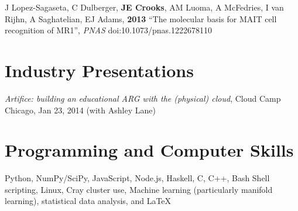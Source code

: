 \documentclass[margin,line]{resume}
\begin{document}
\begin{resume}
    J Lopez-Sagaseta, C Dulberger, \textbf{JE Crooks}, AM Luoma, A McFedries, I van Rijhn, A Saghatelian, EJ Adams, 
    \textbf{2013}
    ``The molecular basis for MAIT cell recognition of MR1'',
    \textsl{PNAS} doi:10.1073/pnas.1222678110

    \vspace{-2mm}

    \section{\mysidestyle Industry Presentations}
    \emph{Artifice: building an educational ARG with the (physical) cloud}, Cloud Camp Chicago, Jan 23, 2014 (with Ashley Lane)
    \vspace{-2mm}
    \section{\mysidestyle Programming and Computer Skills} 

    Python, NumPy/SciPy, JavaScript, Node.js, Haskell, C, C++, Bash Shell scripting, Linux, Cray cluster use, Machine learning (particularly manifold learning), statistical data analysis, and \LaTeX \\
    \vspace{-2mm}

\end{resume}
\end{document}
